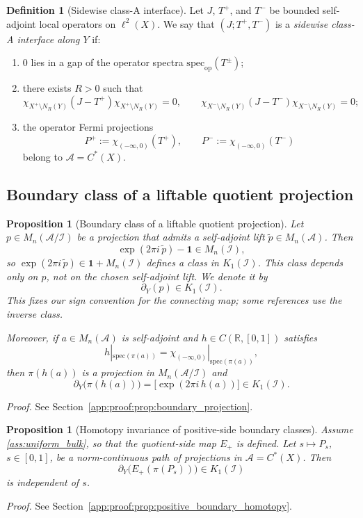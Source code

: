 \documentclass[11pt]{article}
\numberwithin{equation}{section}
\newtheorem{proposition}[theorem]{Proposition}
\theoremstyle{definition}
\newtheorem{definition}[theorem]{Definition}
\theoremstyle{remark}
\newcommand{\proofref}[1]{%
  \par\noindent\emph{Proof.} See Section~\ref{#1}.\par\medskip
}
\newcommand{\proofappendixref}[1]{\proofref{#1}}
\newcommand{\Id}{\mathbf{1}}
\newcommand{\spec}{\mathrm{spec}}
\begin{document}
\begin{definition}[Sidewise class-A interface]\label{def:sidewise_interface}
Let $J$, $T^+$, and $T^-$ be bounded self-adjoint local operators on $\ell^2(X)$. We say that
$(J;T^+,T^-)$ is a \emph{sidewise class-A interface along $Y$} if:
\begin{enumerate}[label=(\roman*),leftmargin=2em]
\item $0$ lies in a gap of the operator spectra $\spec_{\mathrm{op}}(T^\pm)$;
\item there exists $R>0$ such that
\[
\chi_{X^+\setminus N_R(Y)}(J-T^+)\chi_{X^+\setminus N_R(Y)}=0,
\qquad
\chi_{X^-\setminus N_R(Y)}(J-T^-)\chi_{X^-\setminus N_R(Y)}=0;
\]
\item the operator Fermi projections
\[
P^+:=\chi_{(-\infty,0)}(T^+),
\qquad
P^-:=\chi_{(-\infty,0)}(T^-)
\]
belong to $\mathcal A=C^*(X)$.
\end{enumerate}
\end{definition}

\subsection{Boundary class of a liftable quotient projection}

\begin{proposition}[Boundary class of a liftable quotient projection]\label{prop:boundary_projection}
Let $p\in M_n(\mathcal A/\mathcal I)$ be a projection that admits a self-adjoint lift
$\widetilde p\in M_n(\mathcal A)$. Then
\[
\exp(2\pi i\,\widetilde p)-\Id \in M_n(\mathcal I),
\]
so $\exp(2\pi i\,\widetilde p)\in \Id+M_n(\mathcal I)$ defines a class in $K_1(\mathcal I)$. This
class depends only on $p$, not on the chosen self-adjoint lift. We denote it by
\[
\partial_Y(p)\in K_1(\mathcal I).
\]
This fixes our sign convention for the connecting map; some references use the inverse class.

Moreover, if $a\in M_n(\mathcal A)$ is self-adjoint and $h\in C(\mathbb R,[0,1])$ satisfies
\[
h|_{\spec(\pi(a))}=\chi_{(-\infty,0)}|_{\spec(\pi(a))},
\]
then $\pi(h(a))$ is a projection in $M_n(\mathcal A/\mathcal I)$ and
\[
\partial_Y\!\bigl(\pi(h(a))\bigr)
=
\bigl[\exp(2\pi i\,h(a))\bigr]\in K_1(\mathcal I).
\]
\end{proposition}
\proofappendixref{app:proof:prop:boundary_projection}




\begin{proposition}[Homotopy invariance of positive-side boundary classes]\label{prop:positive_boundary_homotopy}
Assume \ref{ass:uniform_bulk}, so that the quotient-side map $E_+$ is defined. Let
$s\mapsto P_s$, $s\in[0,1]$, be a norm-continuous path of projections in $\mathcal A=C^*(X)$. Then
\[
\partial_Y\!\bigl(E_+(\pi(P_s))\bigr)\in K_1(\mathcal I)
\]
is independent of $s$.
\end{proposition}
\proofappendixref{app:proof:prop:positive_boundary_homotopy}
\end{document}
